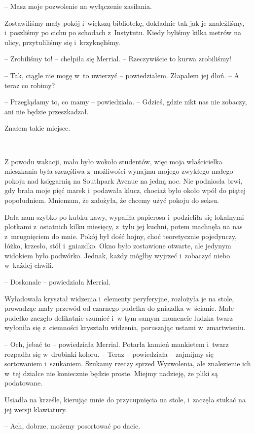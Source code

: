 \documentclass[oneside,polish,11pt,sfheadings]{mwbk}
\begin{document}
-- Masz moje pozwolenie na wyłączenie zasilania.

Zostawiliśmy mały pokój i~większą bibliotekę, dokładnie tak jak je
znaleźliśmy, i~poszliśmy po cichu po schodach z~Instytutu. Kiedy byliśmy
kilka metrów na ulicy, przytuliliśmy się i~krzyknęliśmy.

-- Zrobiliśmy to! -- chełpiła się Merrial. -- Rzeczywiście to kurwa
zrobiliśmy!

-- Tak, ciągle nie mogę w~to uwierzyć -- powiedziałem. Złapałem jej dłoń.
-- A teraz co robimy?

-- Przeglądamy to, co mamy -- powiedziała. -- Gdzieś, gdzie nikt nas nie
zobaczy, ani nie będzie przeszkadzał.

Znałem takie miejsce.

~

Z powodu wakacji, mało było wokoło studentów, więc moja właścicielka
mieszkania była szczęśliwa z~możliwości wynajmu mojego zwykłego małego
pokoju nad księgarnią na Southpark Avenue na jedną noc. Nie podniosła
brwi, gdy brała moje pięć marek i~podawała klucz, chociaż było około
wpół do piątej popołudniem. Mniemam, że założyła, że chcemy użyć pokoju
do seksu.

Dała nam szybko po kubku kawy, wypaliła papierosa i~podzieliła się
lokalnymi plotkami z~ostatnich kilku miesięcy, z~tyłu jej kuchni, potem
machnęła na nas z~mrugnięciem do mnie. Pokój był dość hojny, choć
teoretycznie pojedynczy, łóżko, krzesło, stół i~gniazdko. Okno było
zostawione otwarte, ale jedynym widokiem było podwórko. Jednak, każdy
mógłby wyjrzeć i~zobaczyć niebo w~każdej chwili.

-- Doskonale -- powiedziała Merrial.

Wyładowała kryształ widzenia i~elementy peryferyjne, rozłożyła je na
stole, prowadząc mały przewód od czarnego pudełka do gniazdka w~ścianie.
Małe pudełko zaczęło delikatnie szumieć i~w tym samym momencie ludzka
twarz wyłoniła się z~ciemności kryształu widzenia, poruszając ustami w~zmartwieniu.

-- Och, jebać to -- powiedziała Merrial. Potarła kamień mankietem i~twarz
rozpadła się w~drobinki koloru. -- Teraz -- powiedziała -- zajmijmy się
sortowaniem i~szukaniem. Szukamy rzeczy sprzed Wyzwolenia, ale
znalezienie ich w~tej działce nie koniecznie będzie proste. Miejmy
nadzieję, że pliki są podatowane.

Usiadła na krześle, kierując mnie do przycupnięcia na stole, i~zaczęła stukać
na jej wersji klawiatury. 

-- Ach, dobrze, możemy posortować po dacie.
\end{document}
